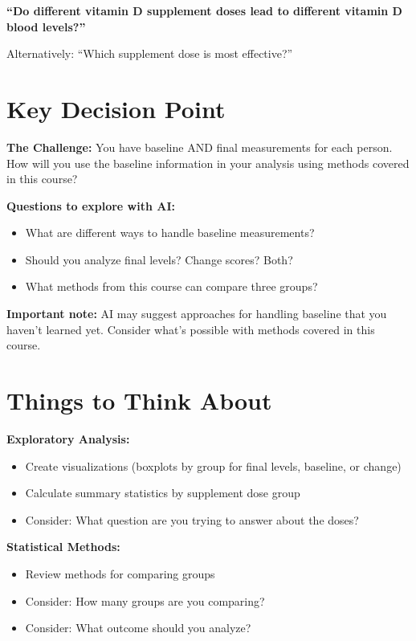 \documentclass[11pt]{article}
\begin{document}
\textbf{``Do different vitamin D supplement doses lead to different vitamin D blood levels?''}

Alternatively: ``Which supplement dose is most effective?''

\section*{Key Decision Point}

\begin{tcolorbox}[colback=osaorange!10,colframe=osaorange,boxrule=1pt,arc=2pt]
\textbf{The Challenge:} You have baseline AND final measurements for each person. How will you use the baseline information in your analysis using methods covered in this course?

\textbf{Questions to explore with AI:}
\begin{itemize}
\item What are different ways to handle baseline measurements?
\item Should you analyze final levels? Change scores? Both?
\item What methods from this course can compare three groups?
\end{itemize}

\textbf{Important note:} AI may suggest approaches for handling baseline that you haven't learned yet. Consider what's possible with methods covered in this course.
\end{tcolorbox}

\section*{Things to Think About}

\textbf{Exploratory Analysis:}
\begin{itemize}
\item Create visualizations (boxplots by group for final levels, baseline, or change)
\item Calculate summary statistics by supplement dose group
\item Consider: What question are you trying to answer about the doses?
\end{itemize}

\textbf{Statistical Methods:}
\begin{itemize}
\item Review methods for comparing groups
\item Consider: How many groups are you comparing?
\item Consider: What outcome should you analyze?
\end{itemize}
\end{document}
